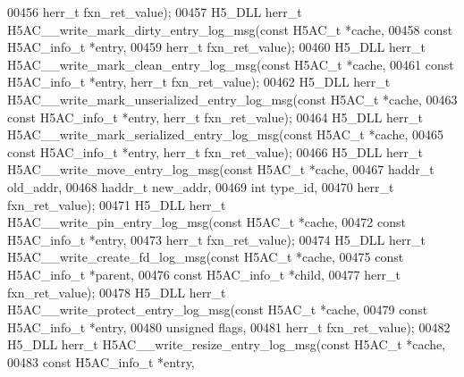 \begin{DoxyCode}
00456                                                herr\_t fxn\_ret\_value);
00457 H5\_DLL herr\_t H5AC\_\_write\_mark\_dirty\_entry\_log\_msg(\textcolor{keyword}{const} H5AC\_t *cache,
00458                                                    \textcolor{keyword}{const} H5AC\_info\_t *entry,
00459                                                    herr\_t fxn\_ret\_value);
00460 H5\_DLL herr\_t H5AC\_\_write\_mark\_clean\_entry\_log\_msg(\textcolor{keyword}{const} H5AC\_t *cache,
00461     \textcolor{keyword}{const} H5AC\_info\_t *entry, herr\_t fxn\_ret\_value);
00462 H5\_DLL herr\_t H5AC\_\_write\_mark\_unserialized\_entry\_log\_msg(\textcolor{keyword}{const} H5AC\_t *cache,
00463         \textcolor{keyword}{const} H5AC\_info\_t *entry, herr\_t fxn\_ret\_value);
00464 H5\_DLL herr\_t H5AC\_\_write\_mark\_serialized\_entry\_log\_msg(\textcolor{keyword}{const} H5AC\_t *cache,
00465     \textcolor{keyword}{const} H5AC\_info\_t *entry, herr\_t fxn\_ret\_value);
00466 H5\_DLL herr\_t H5AC\_\_write\_move\_entry\_log\_msg(\textcolor{keyword}{const} H5AC\_t *cache,
00467                                              haddr\_t old\_addr,
00468                                              haddr\_t new\_addr,
00469                                              \textcolor{keywordtype}{int} type\_id,
00470                                              herr\_t fxn\_ret\_value);
00471 H5\_DLL herr\_t H5AC\_\_write\_pin\_entry\_log\_msg(\textcolor{keyword}{const} H5AC\_t *cache,
00472                                             \textcolor{keyword}{const} H5AC\_info\_t *entry,
00473                                             herr\_t fxn\_ret\_value);
00474 H5\_DLL herr\_t H5AC\_\_write\_create\_fd\_log\_msg(\textcolor{keyword}{const} H5AC\_t *cache,
00475                                             \textcolor{keyword}{const} H5AC\_info\_t *parent,
00476                                             \textcolor{keyword}{const} H5AC\_info\_t *child,
00477                                             herr\_t fxn\_ret\_value);
00478 H5\_DLL herr\_t H5AC\_\_write\_protect\_entry\_log\_msg(\textcolor{keyword}{const} H5AC\_t *cache,
00479                                                 \textcolor{keyword}{const} H5AC\_info\_t *entry,
00480                                                 \textcolor{keywordtype}{unsigned} flags,
00481                                                 herr\_t fxn\_ret\_value);
00482 H5\_DLL herr\_t H5AC\_\_write\_resize\_entry\_log\_msg(\textcolor{keyword}{const} H5AC\_t *cache,
00483                                                \textcolor{keyword}{const} H5AC\_info\_t *entry,

\end{DoxyCode}
